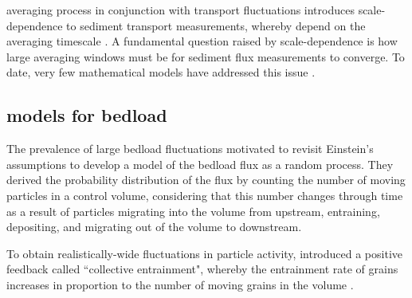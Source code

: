 \DIFdelbegin {}\DIFdelend \DIFaddbegin {}\DIFaddend averaging process in conjunction with transport fluctuations introduces scale-dependence to sediment transport measurements, whereby \DIFdelbegin {}\DIFdelend \DIFaddbegin {}\DIFaddend depend on the averaging timescale \citep{Turowski2010,Campagnol2012,Ancey2020a}.
A fundamental question raised by scale-dependence is how large averaging windows must be for sediment flux measurements to converge.
To date, very few mathematical models have addressed this issue \DIFaddbegin {}\DIFaddend .

\subsection{\DIFdelbegin {}\DIFdelend \DIFaddbegin {}\DIFaddend models for bedload \DIFdelbegin {}\DIFdelend \DIFaddbegin {}\DIFaddend }
\label{sec:birthdeath}
The prevalence of large bedload fluctuations motivated \citet{Ancey2006,Ancey2008} to revisit Einstein's assumptions to develop a model of the bedload flux as a random process.
They derived the probability distribution of the flux by counting the number of moving particles in a control volume, considering that this number changes through time as a result of particles migrating into the volume from upstream, entraining, depositing, and migrating out of the volume to downstream.

To obtain realistically-wide fluctuations in particle activity, \DIFdelbegin {}\DIFdelend \DIFaddbegin {}\DIFaddend introduced a positive feedback \DIFaddbegin {}\DIFaddend called ``collective entrainment", whereby the entrainment rate of grains increases in proportion to the number of moving grains in the \DIFaddbegin {}\DIFaddend volume \citep{Ancey2008,Heyman2013}.

